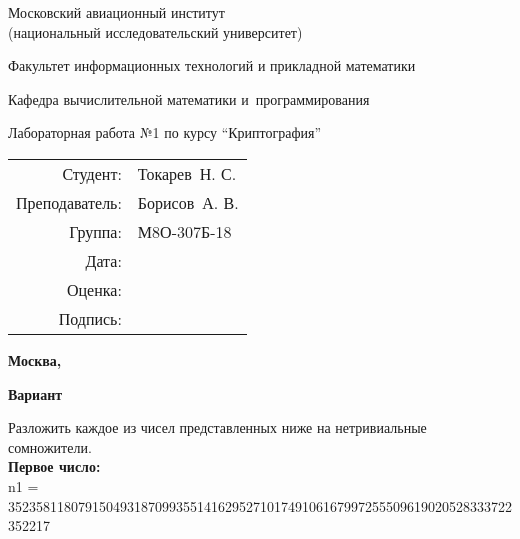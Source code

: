 \documentclass[pdf, unicode, 12pt, a4paper,oneside,fleqn]{article}
\begin{document}
\begin{titlepage}
\begin{center}
\bfseries

{\Large Московский авиационный институт\\ (национальный исследовательский университет)

}

\vspace{48pt}

{\large Факультет информационных технологий и прикладной математики
}

\vspace{36pt}


{\large Кафедра вычислительной математики и~программирования

}


\vspace{48pt}

Лабораторная работа №1 по курсу \enquote{Криптография}

\end{center}

\vspace{72pt}

\begin{flushright}
\begin{tabular}{rl}
Студент: & Токарев\ Н. С. \\
Преподаватель: & Борисов\ А. В. \\
Группа: & М8О-307Б-18 \\
Дата: & \\
Оценка: & \\
Подпись: & \\
\end{tabular}
\end{flushright}

\vfill

\begin{center}
\bfseries
Москва, \the\year
\end{center}
\end{titlepage}

\textbf{Вариант }

Разложить каждое из чисел представленных ниже на нетривиальные сомножители. \\

{\bfseries Первое число:} \\

n1 = \\
352358118079150493187099355141629527101749106167997255509619020528333722352217 \\
\end{document}
